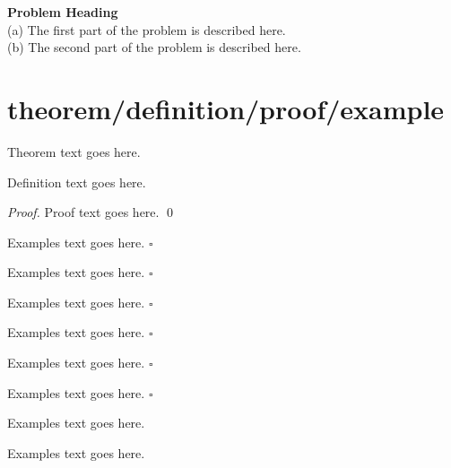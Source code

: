 \begin{prob}
	\label{prob2}
	\textbf{Problem Heading}\\
	(a) The first part of the problem is described here.\\
	(b) The second part of the problem is described here.
\end{prob}


\section{theorem/definition/proof/example}
\begin{theorem}
	Theorem text goes here.
\end{theorem}

%
\begin{definition}[DfName]
	Definition text goes here.
\end{definition}

\begin{proof}
	Proof text goes here.
	\qed
\end{proof}

\begin{example}
	Examples text goes here.  \hfill$\square$ 
\end{example}

\begin{corollary}
	Examples text goes here.  \hfill$\square$ 
\end{corollary}

\begin{lemma}
	Examples text goes here.  \hfill$\square$ 
\end{lemma}

\begin{remark}
	Examples text goes here.  \hfill$\square$ 
\end{remark}

\begin{proposition}
	Examples text goes here.  \hfill$\square$ 
\end{proposition}

\begin{property}
	Examples text goes here.  \hfill$\square$ 
\end{property}

\begin{note}
	Examples text goes here.
\end{note}

\begin{problem}
	Examples text goes here.
\end{problem}

